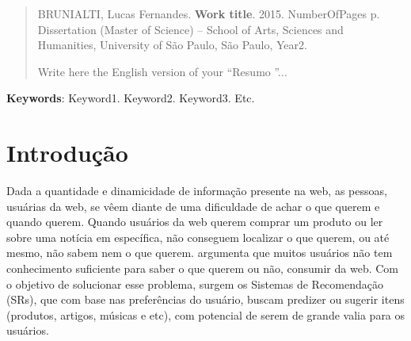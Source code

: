 \documentclass[normaltoc, espacoumemeio, pnumromarab,ruledheader]{abnt}
\begin{document}
%
%
%
%


\begin{abstract}
\begin{flushleft}
\noindent BRUNIALTI, Lucas Fernandes. \textbf{Work title}. 2015. NumberOfPages p. Dissertation (Master of Science) -- School of Arts, Sciences and Humanities, University of São Paulo, São Paulo, Year2.
\newline
\end{flushleft}


\noindent Write here the English version of your \textquotedblleft Resumo \textquotedblright...
\end{abstract}

\par
\vspace{2em}
\noindent \textbf{Keywords}: Keyword1. Keyword2. Keyword3. Etc.

\listoffigures

\listoftables



\tableofcontents


\chapter{Introdução}
\label{intro}


Dada a quantidade e dinamicidade de informação presente na web, as pessoas, usuárias da web, se vêem diante de uma dificuldade de achar o que querem e quando querem.
Quando usuários da web querem comprar um produto ou ler sobre uma notícia em específica, não conseguem localizar o que querem, ou até mesmo, não sabem nem o que querem.
 argumenta que muitos usuários não tem conhecimento suficiente para saber o que querem ou não, consumir da web.
Com o objetivo de solucionar esse problema, surgem os Sistemas de Recomendação (SRs), que com base nas preferências do usuário, buscam predizer ou sugerir itens (produtos, artigos, músicas e etc), com potencial de serem de grande valia para os usuários.
\end{document}
